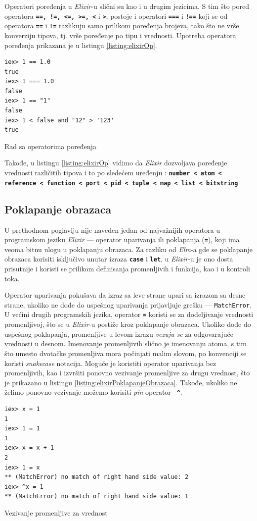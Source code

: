 \documentclass[12pt,oneside]{memoir}
\begin{document}
Operatori poređenja u \emph{Elixir}-u slični su kao i u drugim jezicima. S tim što pored operatora 
\texttt{\textbf{==, !=, <=, >=, <}} i \texttt{\textbf{>}}, postoje i operatori 
\texttt{\textbf{===}} i \texttt{\textbf{!==}} koji se od operatora \texttt{\textbf{==}} i
\texttt{\textbf{!=}} razlikuju samo prilikom poređenja brojeva, tako što ne vrše konverziju
tipova, tj. vrše poređenje po tipu i vrednosti. Upotreba operatora poređenja prikazana je u
listingu \ref{listing:elixirOp}.  
\begin{listing}[!h]
\begin{verbatim}
iex> 1 == 1.0
true
iex> 1 === 1.0
false
iex> 1 == "1"
false
iex> 1 < false and "12" > '123'
true
\end{verbatim}
\caption{Rad sa operatorima poređenja}
\label{listing:elixirOp}
\end{listing}

Takođe, u listingu \ref{listing:elixirOp} vidimo da \emph{Elixir} dozvoljava poređenje vrednosti
različitih tipova i to po sledećem uređenju : \textbf{\texttt{number < atom < reference <
function < port < pid < tuple < map < list < bitstring}}

\subsection{Poklapanje obrazaca}
U prethodnom poglavlju nije naveden jedan od najvažnijih operatora u programskom jeziku
\emph{Elixir} ---  operator uparivanja ili poklapanja (\texttt{\textbf{=}}), koji ima veoma
bitnu ulogu u poklapanju obrazaca. Za razliku od \emph{Elm}-a gde se
poklapanje obrazaca korisiti isključivo unutar izraza \textbf{\texttt{case}} i
\textbf{\texttt{let}}, u \emph{Elixir}-u je ono dosta prisutnije i koristi se prilikom
definisanja promenljivih i funkcija, kao i u kontroli toka.

Operator uparivanja pokušava da izraz sa leve strane upari sa izrazom sa desne strane,
ukoliko ne dođe do uspešnog uparivanja prijavljuje grešku --- \texttt{MatchError}.
U većini drugih programskih jezika, operator \texttt{\textbf{=}} koristi se za dodeljivanje
vrednosti promenljivoj, što se u \emph{Elixir}-u postiže kroz poklapanje obrazaca. Ukoliko
dođe do uspešnog poklapanja, promenljive u levom izrazu \emph{vezuju se} za odgovarajuće
vrednosti u desnom. Imenovanje promenljivih slično je imenovanju atoma, s tim što umesto
dvotačke promenljiva mora počinjati malim slovom, po konvenciji se koristi
\emph{snake\textunderscore{}case} notacija. Moguće je koristiti operator uparivanja bez 
promenljivih, kao i izvršiti ponovno vezivanje promenljive za drugu vrednost, što je 
prikazano u listingu \ref{listing:elixirPoklapanjeObrazaca}. Takođe, ukoliko ne želimo
ponovno vezivanje možemo korisiti \emph{pin} operator \textbf{\texttt{ \^{}}}.  
\begin{listing}[!h]
\begin{verbatim}
iex> x = 1
1
iex> 1 = 1
1
iex> x = x + 1
2
iex> 1 = x  
** (MatchError) no match of right hand side value: 2
iex> ^x = 1
** (MatchError) no match of right hand side value: 1
\end{verbatim}
\caption{Vezivanje promenljive za vrednost}
\label{listing:elixirPoklapanjeObrazaca}
\end{listing}
\end{document}
